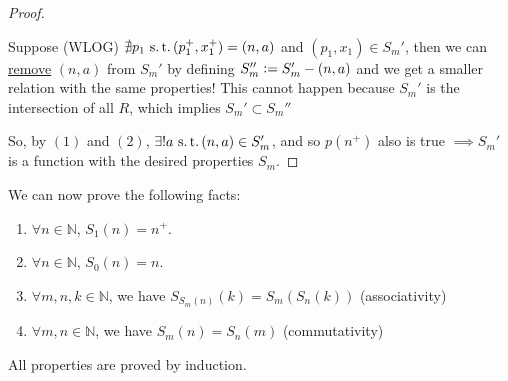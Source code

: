 \documentclass[12pt]{amsart}
\newcommand{\bbN}{\mathbb{N}}
\newcommand{\suchthat}{\operatorname{\thinspace s.t. \thinspace}}
\theoremstyle{plain}
\theoremstyle{remark}
\theoremstyle{definition}
\begin{document}
\begin{proof}
\begin{enumerate}[(1)]
	\par
	Suppose (WLOG) $\nexists p_1 \suchthat (p_1^+, x_1^+) = (n, a)$ and $(p_1, x_1) \in S_m'$, then we can \ul{remove} $(n, a)$ from $S_m'$ by defining $S_m'' \vcentcolon = S_m' - (n,a)$ and we get a smaller relation with the same properties! This cannot happen because $S_m'$ is the intersection of all $R$, which implies $S_m' \subset S_m''$ 
	
	\end{enumerate}

	\par	
	So, by $(1)$ and $(2)$, $ \exists! a \suchthat (n, a) \in S_m'$, and so $p(n^+)$ also is true $\implies S_m'$ is a function with the desired properties $S_m$.
\end{proof}

\hfill
\newline
We can now prove the following facts:
\begin{enumerate}[(1)]
	\item $\forall n \in \bbN$, $S_1(n) = n^+$.
	\item $\forall n \in \bbN$, $S_0(n) = n$.
	\item $\forall m, n, k \in \bbN$, we have $S_{S_m(n)}(k) = S_m\left( S_n(k) \right)$ (associativity)
	\item $\forall m, n \in \bbN$, we have $ S_m(n) = S_n(m)$ (commutativity)
\end{enumerate}
All properties are proved by induction.
\end{document}
